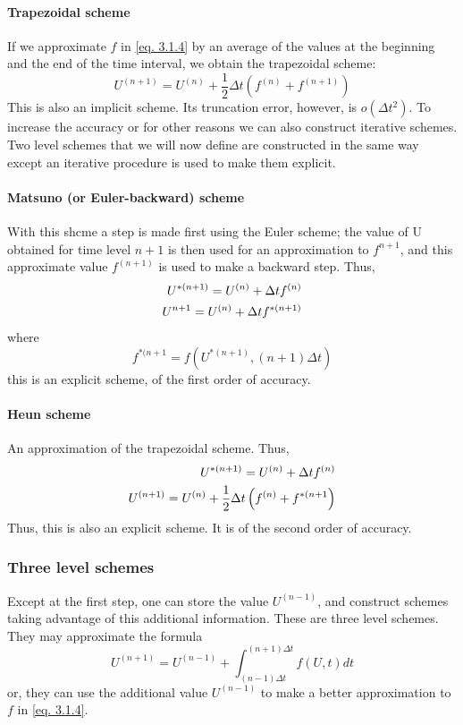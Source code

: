 \paragraph{Trapezoidal scheme}
If we approximate $f$ in \ref{eq. 3.1.4} by an average of the values at the beginning and the end of the time interval, we obtain the trapezoidal scheme:
\begin{equation}\label{3.1.7}
    U^{(n+1)}=U^{(n)}+\frac{1}{2}\Delta t\left(f^{(n)}+f^{(n+1)}\right)
\end{equation}
This is also an implicit scheme. Its truncation error, however, is $o(\Delta t^2)$. To increase the accuracy or for other reasons we can also construct iterative schemes. Two level schemes that we will now define are constructed in the same way except an iterative procedure is used to make them explicit. 
\paragraph{Matsuno (or Euler-backward) scheme}
With this shcme a step is made first using the Euler scheme; the value of U obtained for time level $n+1$ is then used for an approximation to $f^{n+1}$, and this approximate value $f^{(n+1)}$ is used to make a backward step. Thus, 
\begin{align}\label{3.1.8}
    U^{*(n+1)}=U^{(n)}+\Delta tf^{(n)} \\
    U^{n+1}=U^{(n)}+\Delta  tf^{*(n+1)}\notag
\end{align}
where
$$f^{*(n+1}=f\left(U^{*(n+1)}, (n+1)\Delta t\right)$$
this is an explicit scheme, of the first order of accuracy.
\paragraph{Heun scheme}
An approximation of the trapezoidal scheme. Thus, 
\begin{align}
    U^{*(n+1)}=U^{(n)}+\Delta t f^{(n)} \\
    U^{(n+1)}=U^{(n)}+\frac{1}{2}\Delta t \left(f^{(n)}+f^{*(n+1}\right) \notag
\end{align}
Thus, this is also an explicit scheme. It is of the second order of accuracy.
\subsubsection{Three level schemes}
Except at the first step, one can store the value $U^{(n-1)}$, and construct schemes taking advantage of this additional information. These are three level schemes. They may approximate the formula
\begin{equation}\label{3.1.10}
    U^{(n+1)}=U^{(n-1)}+\int_{(n-1)\Delta t}^{(n+1)\Delta t}f(U,t)dt
\end{equation}
or, they can use the additional value $U^{(n-1)}$ to make a better approximation to $f$ in \ref{eq. 3.1.4}.
